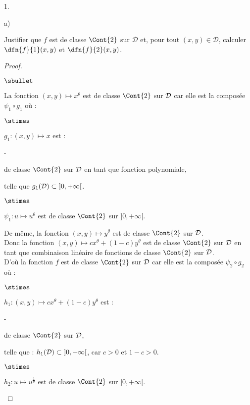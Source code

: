 \documentclass[11pt]{article}%
\begin{document}
\begin{noliste}{1.}
\begin{noliste}{a)}
  
  \item Justifier que $f$ est de classe $\Cont{2}$ sur $\mathcal{D}$ 
  et, pour tout $(x,y) \in \mathcal{D}$, calculer $\dfn{f}{1}(x,y)$ et 
  $\dfn{f}{2}(x,y)$.
  
  \begin{proof}~
   \begin{noliste}{$\sbullet$}
    \item La fonction $(x,y) \mapsto x^\theta$ est de classe $\Cont{2}$
    sur ${\cal D}$ car elle est la composée $\psi_1 \circ g_1$ où :
    \begin{noliste}{$\stimes$}
      \item $g_1 : (x,y) \mapsto x$ est :
    \end{noliste}
      \begin{liste}{-}
	\item de classe $\Cont{2}$ sur 
        ${\cal D}$ en tant que fonction polynomiale,
	\item telle que $g_1({\cal D}) \subset \ ]0,+\infty[$.
      \end{liste}
    \begin{noliste}{$\stimes$}
      \item $\psi_1 : u \mapsto u^\theta$ est de classe $\Cont{2}$ sur 
      $]0,+\infty[$.
    \end{noliste}
    De même, la fonction $(x,y) \mapsto y^\theta$ est de classe 
    $\Cont{2}$ sur ${\cal D}$.\\
    Donc la fonction $(x,y) \mapsto c x^\theta + (1-c) y^\theta$
    est de classe $\Cont{2}$ sur ${\cal D}$ en tant que 
    combinaison linéaire de fonctions de classe $\Cont{2}$ sur 
    ${\cal D}$.\\
    D'où la fonction $f$ est de classe $\Cont{2}$ sur ${\cal D}$
    car elle est la composée $\psi_2 \circ g_2$ où :
    \begin{noliste}{$\stimes$}
      \item $h_1 : (x,y) \mapsto c x^\theta + (1-c) y^\theta$ est :
    \end{noliste}
    \begin{liste}{-}
      \item de classe $\Cont{2}$ sur ${\cal D}$,
      \item telle que : $h_1({\cal D}) \subset \ ]0,+\infty[$, car 
      $c>0$ et $1-c>0$.
    \end{liste}
    \begin{noliste}{$\stimes$}
      \item $h_2 : u \mapsto u^{\frac{1}{\theta}}$ est de classe 
      $\Cont{2}$ sur $]0,+\infty[$.
    \end{noliste}
    

\end{noliste}
\end{proof}
\end{noliste}
\end{noliste}
\end{document}

